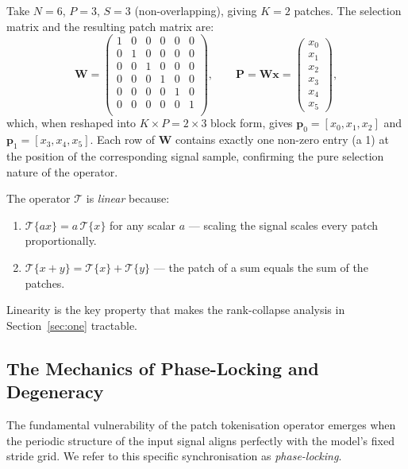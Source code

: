 \begin{example}
	Take $N = 6$, $P = 3$, $S = 3$ (non-overlapping), giving $K = 2$ patches.
	The selection matrix and the resulting patch matrix are:
	\[
	\mathbf{W}
	= \begin{pmatrix}
		1 & 0 & 0 & 0 & 0 & 0 \\
		0 & 1 & 0 & 0 & 0 & 0 \\
		0 & 0 & 1 & 0 & 0 & 0 \\
		0 & 0 & 0 & 1 & 0 & 0 \\
		0 & 0 & 0 & 0 & 1 & 0 \\
		0 & 0 & 0 & 0 & 0 & 1 \\
	\end{pmatrix},
	\qquad
	\mathbf{P}
	= \mathbf{W}\mathbf{x}
	= \begin{pmatrix} x_0 \\ x_1 \\ x_2 \\ x_3 \\ x_4 \\ x_5 \end{pmatrix},
	\]
	which, when reshaped into $K \times P = 2 \times 3$ block form, gives
	$\mathbf{p}_0 = [x_0,x_1,x_2]$ and $\mathbf{p}_1 = [x_3,x_4,x_5]$.
	Each row of $\mathbf{W}$ contains exactly one non-zero entry (a 1) at the position of
	the corresponding signal sample, confirming the pure selection nature of the operator.
\end{example}

\noindent The operator $\mathcal{T}$ is \emph{linear} because:
\begin{enumerate}
	\item $\mathcal{T}\{ax\} = a\,\mathcal{T}\{x\}$ for any scalar $a$ — scaling the
	signal scales every patch proportionally.
	\item $\mathcal{T}\{x+y\} = \mathcal{T}\{x\} + \mathcal{T}\{y\}$ — the patch of a
	sum equals the sum of the patches.
\end{enumerate}
Linearity is the key property that makes the rank-collapse analysis in
Section~\ref{sec:one} tractable.

\subsection{The Mechanics of Phase-Locking and Degeneracy}

The fundamental vulnerability of the patch tokenisation operator emerges when the periodic
structure of the input signal aligns perfectly with the model's fixed stride grid.
We refer to this specific synchronisation as \emph{phase-locking}.

